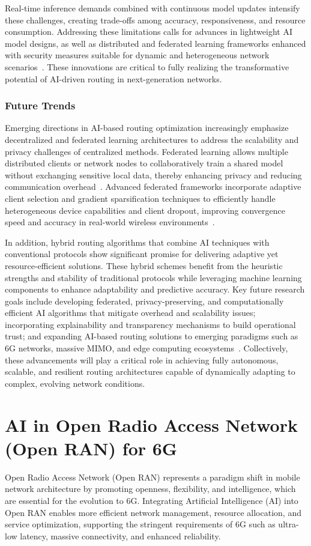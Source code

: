 \documentclass[sigconf]{acmart}
\begin{document}
Real-time inference demands combined with continuous model updates intensify these challenges, creating trade-offs among accuracy, responsiveness, and resource consumption. Addressing these limitations calls for advances in lightweight AI model designs, as well as distributed and federated learning frameworks enhanced with security measures suitable for dynamic and heterogeneous network scenarios~\cite{ref4,ref53}. These innovations are critical to fully realizing the transformative potential of AI-driven routing in next-generation networks.

\subsubsection{Future Trends}

Emerging directions in AI-based routing optimization increasingly emphasize decentralized and federated learning architectures to address the scalability and privacy challenges of centralized methods. Federated learning allows multiple distributed clients or network nodes to collaboratively train a shared model without exchanging sensitive local data, thereby enhancing privacy and reducing communication overhead~\cite{ref53}. Advanced federated frameworks incorporate adaptive client selection and gradient sparsification techniques to efficiently handle heterogeneous device capabilities and client dropout, improving convergence speed and accuracy in real-world wireless environments~\cite{ref49}.

In addition, hybrid routing algorithms that combine AI techniques with conventional protocols show significant promise for delivering adaptive yet resource-efficient solutions. These hybrid schemes benefit from the heuristic strengths and stability of traditional protocols while leveraging machine learning components to enhance adaptability and predictive accuracy. Key future research goals include developing federated, privacy-preserving, and computationally efficient AI algorithms that mitigate overhead and scalability issues; incorporating explainability and transparency mechanisms to build operational trust; and expanding AI-based routing solutions to emerging paradigms such as 6G networks, massive MIMO, and edge computing ecosystems~\cite{ref53}. Collectively, these advancements will play a critical role in achieving fully autonomous, scalable, and resilient routing architectures capable of dynamically adapting to complex, evolving network conditions.

\section{AI in Open Radio Access Network (Open RAN) for 6G}
Open Radio Access Network (Open RAN) represents a paradigm shift in mobile network architecture by promoting openness, flexibility, and intelligence, which are essential for the evolution to 6G. Integrating Artificial Intelligence (AI) into Open RAN enables more efficient network management, resource allocation, and service optimization, supporting the stringent requirements of 6G such as ultra-low latency, massive connectivity, and enhanced reliability.
\end{document}
